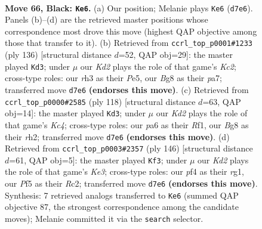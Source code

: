 \documentclass[11pt]{article}
\begin{document}
\clearpage

\begin{figure}[p]\centering
\begin{subfigure}{0.46\textwidth}\centering
\resizebox{\linewidth}{!}{%
\newchessgame
\chessboard[
  setfen={1r4b1/p1pk2r1/P1p3p1/2P2p1p/RP3P1P/7R/5K2/1N6 b - - 55 66},
  showmover=false,
  pgfstyle=straightmove, color=movearrow, markmove={d7-e6}
]}
\caption{}
\end{subfigure}\hfill
\begin{subfigure}{0.46\textwidth}\centering
\resizebox{\linewidth}{!}{%
\newchessgame
\chessboard[
  setfen={8/p4k2/r1p1p3/1p2Pp2/1P1P2p1/P1R3P1/2K2P1r/5R2 w - - 6 69},
  showmover=false,
  pgfstyle=straightmove, color=movearrow, markmove={c2-d3}
]}
\caption{}
\end{subfigure}
\\[4pt]
\begin{subfigure}{0.46\textwidth}\centering
\resizebox{\linewidth}{!}{%
\newchessgame
\chessboard[
  setfen={8/1p1k4/p1pr1p2/P5p1/1PKPR1P1/4P3/7r/5R2 w - - 21 60},
  showmover=false,
  pgfstyle=straightmove, color=movearrow, markmove={c4-d3}
]}
\caption{}
\end{subfigure}\hfill
\begin{subfigure}{0.46\textwidth}\centering
\resizebox{\linewidth}{!}{%
\newchessgame
\chessboard[
  setfen={8/2r1pk2/6p1/1Rn4p/p1P2P1P/4K1P1/P1R1B3/6r1 w - - 69 74},
  showmover=false,
  pgfstyle=straightmove, color=movearrow, markmove={e3-f3}
]}
\caption{}
\end{subfigure}
\caption{\textbf{Move 66, Black: \texttt{Ke6}.} (a) Our position; Melanie plays \texttt{Ke6} (\texttt{d7e6}). Panels (b)--(d) are the retrieved master positions whose correspondence most drove this move (highest QAP objective among those that transfer to it). (b) Retrieved from \texttt{ccrl\_top\_p0001\#1233} (ply 136) [structural distance $d$=52, QAP obj=29]: the master played \texttt{Kd3}; under $\mu$ our \emph{Kd2} plays the role of that game's \emph{Kc2}; cross-type roles: our \emph{r}h3 as their \emph{P}e5, our \emph{B}g8 as their \emph{p}a7; transferred move \texttt{d7e6} \textbf{(endorses this move)}. (c) Retrieved from \texttt{ccrl\_top\_p0000\#2585} (ply 118) [structural distance $d$=63, QAP obj=14]: the master played \texttt{Kd3}; under $\mu$ our \emph{Kd2} plays the role of that game's \emph{Kc4}; cross-type roles: our \emph{p}a6 as their \emph{R}f1, our \emph{B}g8 as their \emph{r}h2; transferred move \texttt{d7e6} \textbf{(endorses this move)}. (d) Retrieved from \texttt{ccrl\_top\_p0003\#2357} (ply 146) [structural distance $d$=61, QAP obj=5]: the master played \texttt{Kf3}; under $\mu$ our \emph{Kd2} plays the role of that game's \emph{Ke3}; cross-type roles: our \emph{p}f4 as their \emph{r}g1, our \emph{P}f5 as their \emph{R}c2; transferred move \texttt{d7e6} \textbf{(endorses this move)}. Synthesis: 7 retrieved analogs transferred to \texttt{Ke6} (summed QAP objective 87, the strongest correspondence among the candidate moves); Melanie committed it via the \texttt{search} selector.}
\label{fig:thought-m131}
\end{figure}
\end{document}
